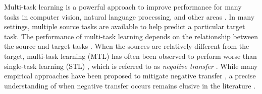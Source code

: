 Multi-task learning is a powerful approach to improve performance for many tasks in computer vision, natural language processing, and other areas \cite{C97,ZY17,R17}.
In many settings, multiple source tasks are available to help predict a particular target task.
The performance of multi-task learning depends on the relationship between the source and target tasks \cite{C97}.
When the sources are relatively different from the target, multi-task learning (MTL) has often been observed to perform worse than single-task learning (STL) \cite{AP16,BS17}, which is referred to as \textit{negative transfer} \cite{PY09}.
While many empirical approaches have been proposed to mitigate negative transfer \cite{ZY17}, a precise understanding of when negative transfer occurs remains elusive in the literature \cite{R17}.


